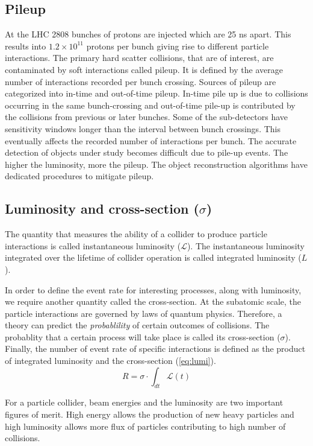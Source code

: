 \subsection*{Pileup}
At the LHC 2808 bunches of protons are injected which are 25 ns apart. This results into 
$1.2 \times 10^{11}$ protons per bunch giving rise to different particle interactions. The 
primary hard scatter collisions, that are of interest, are contaminated by soft interactions 
called pileup. It is defined by the average number of interactions
recorded per bunch crossing. Sources of pileup are categorized into in-time and out-of-time pileup. In-time pile up is due to collisions
occurring in the same bunch-crossing and out-of-time pile-up is contributed by the collisions from previous
or later bunches. Some of the sub-detectors have sensitivity windows longer than the interval between
bunch crossings. This eventually affects the recorded number of interactions per bunch. The accurate
detection of objects under study becomes difficult due to pile-up events. The higher the 
luminosity, more the pileup. The object reconstruction algorithms have dedicated procedures 
to mitigate pileup.

\subsection*{Luminosity and cross-section ($\sigma$)}
The quantity that measures the ability of a collider to produce particle interactions is called
instantaneous luminosity ($\mathcal{L}$). The instantaneous luminosity integrated over the lifetime
of collider operation is called integrated luminosity ($L$).

In order to define the event rate for interesting processes, along with luminosity, we require
another quantity called the cross-section. At the subatomic scale, the particle interactions 
are governed by laws of quantum physics. Therefore, a theory can predict 
the \textit{probablility} of certain outcomes of collisions. The probablity that a certain
process will take place is called its cross-section ($\sigma$). Finally, the number of event rate of
specific interactions is defined as the product of integrated luminosity and the cross-section (\cref{eq:lumi}).
\begin{equation}
    R = \sigma \cdot \int_{dt} \mathcal{L}(t)
    \label{eq:lumi}
\end{equation}

For a particle collider, beam energies and the luminosity are two important figures of merit. 
High energy allows the production of new heavy particles and high luminosity allows more flux 
of particles contributing to high number of collisions.
















